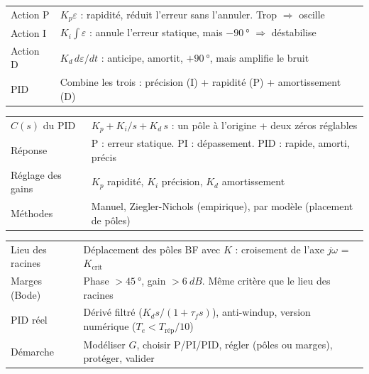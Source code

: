 \documentclass[12pt,a4paper,twoside]{book}
\begin{document}
\begin{bases}[title={\color{white} Résumé --- Les Bases}]
\begin{center}
\renewcommand{\arraystretch}{1.3}
\begin{tabular}{p{3.0cm}p{10.0cm}}
\toprule
Action P & $K_p\varepsilon$ : rapidité, réduit l'erreur sans l'annuler. Trop $\Rightarrow$ oscille \\
Action I & $K_i\!\int\!\varepsilon$ : annule l'erreur statique, mais $-\SI{90}{°}$ $\Rightarrow$ déstabilise \\
Action D & $K_d\,d\varepsilon/dt$ : anticipe, amortit, $+\SI{90}{°}$, mais amplifie le bruit \\
PID & Combine les trois : précision (I) + rapidité (P) + amortissement (D) \\
\bottomrule
\end{tabular}
\end{center}
\end{bases}

\begin{approfondissement}[title={\color{white} Résumé --- Approfondissement}]
\begin{center}
\renewcommand{\arraystretch}{1.3}
\begin{tabular}{p{3.0cm}p{10.0cm}}
\toprule
$C(s)$ du PID & $K_p + K_i/s + K_d\,s$ : un pôle à l'origine + deux zéros réglables \\
Réponse & P : erreur statique. PI : dépassement. PID : rapide, amorti, précis \\
Réglage des gains & $K_p$ rapidité, $K_i$ précision, $K_d$ amortissement \\
Méthodes & Manuel, Ziegler-Nichols (empirique), par modèle (placement de pôles) \\
\bottomrule
\end{tabular}
\end{center}
\end{approfondissement}

\begin{ingenieur}[title={\color{white} Résumé --- Niveau Ingénieur}]
\begin{center}
\renewcommand{\arraystretch}{1.3}
\begin{tabular}{p{3.0cm}p{10.0cm}}
\toprule
Lieu des racines & Déplacement des pôles BF avec $K$ : croisement de l'axe $j\omega$ = $K_{\text{crit}}$ \\
Marges (Bode) & Phase $> \SI{45}{°}$, gain $> \SI{6}{dB}$. Même critère que le lieu des racines \\
PID réel & Dérivé filtré ($K_d s/(1+\tau_f s)$), anti-windup, version numérique ($T_e < T_{\text{rép}}/10$) \\
Démarche & Modéliser $G$, choisir P/PI/PID, régler (pôles ou marges), protéger, valider \\
\bottomrule
\end{tabular}
\end{center}
\end{ingenieur}
\end{document}
